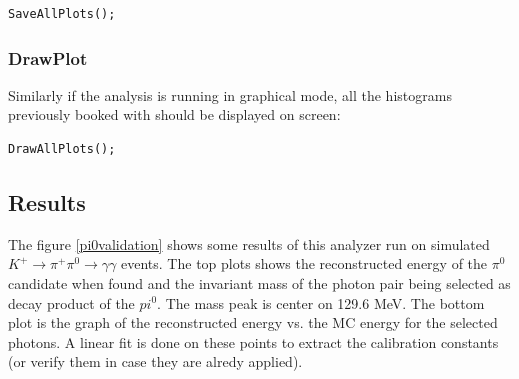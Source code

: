 \begin{lstlisting}
SaveAllPlots();
\end{lstlisting} 

\subsubsection{DrawPlot}
Similarly if the analysis is running in graphical mode, all the histograms previously booked with
 should be displayed on screen:

\begin{lstlisting}
DrawAllPlots();
\end{lstlisting} 

\subsection{Results}
The figure \ref{pi0validation} shows some results of this analyzer run on simulated
$K^+\to\pi^+\pi^0\to\gamma\gamma$ events. The top plots shows the reconstructed energy of the
$\pi^0$ candidate when found and the invariant mass of the photon pair being selected as decay
product of the $pi^0$. The mass peak is center on 129.6 MeV. The bottom plot is the graph of the
reconstructed energy vs. the MC energy for the selected photons. A linear fit is done on these
points to extract the calibration constants (or verify them in case they are alredy applied).

